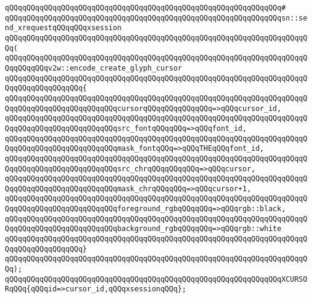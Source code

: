 \verb|qQQqqQQqqQQqqQQqqQQqqQQqqQQqqQQqqQQqqQQqqQQqqQQqqQQqqQQqqQQqqQQq#|\newline
\verb|qQQqqQQqqQQqqQQqqQQqqQQqqQQqqQQqqQQqqQQqqQQqqQQqqQQqqQQqqQQqqQQqsn::send_xrequestqQQqqQQqxsession|\newline
\verb|qQQqqQQqqQQqqQQqqQQqqQQqqQQqqQQqqQQqqQQqqQQqqQQqqQQqqQQqqQQqqQQqqQQqqQQq(|\newline
\verb|qQQqqQQqqQQqqQQqqQQqqQQqqQQqqQQqqQQqqQQqqQQqqQQqqQQqqQQqqQQqqQQqqQQqqQQqqQQqqQQqv2w::encode_create_glyph_cursor|\newline
\verb|qQQqqQQqqQQqqQQqqQQqqQQqqQQqqQQqqQQqqQQqqQQqqQQqqQQqqQQqqQQqqQQqqQQqqQQqqQQqqQQqqQQqqQQq{|\newline
\verb|qQQqqQQqqQQqqQQqqQQqqQQqqQQqqQQqqQQqqQQqqQQqqQQqqQQqqQQqqQQqqQQqqQQqqQQqqQQqqQQqqQQqqQQqqQQqqQQqcursorqQQqqQQqqQQqqQQq=>qQQqcursor_id,|\newline
\newline
\verb|qQQqqQQqqQQqqQQqqQQqqQQqqQQqqQQqqQQqqQQqqQQqqQQqqQQqqQQqqQQqqQQqqQQqqQQqqQQqqQQqqQQqqQQqqQQqqQQqsrc_fontqQQqqQQq=>qQQqfont_id,|\newline
\verb|qQQqqQQqqQQqqQQqqQQqqQQqqQQqqQQqqQQqqQQqqQQqqQQqqQQqqQQqqQQqqQQqqQQqqQQqqQQqqQQqqQQqqQQqqQQqqQQqmask_fontqQQq=>qQQqTHEqQQqfont_id,|\newline
\newline
\verb|qQQqqQQqqQQqqQQqqQQqqQQqqQQqqQQqqQQqqQQqqQQqqQQqqQQqqQQqqQQqqQQqqQQqqQQqqQQqqQQqqQQqqQQqqQQqqQQqsrc_chrqQQqqQQqqQQq=>qQQqcursor,|\newline
\verb|qQQqqQQqqQQqqQQqqQQqqQQqqQQqqQQqqQQqqQQqqQQqqQQqqQQqqQQqqQQqqQQqqQQqqQQqqQQqqQQqqQQqqQQqqQQqqQQqmask_chrqQQqqQQq=>qQQqcursor+1,|\newline
\newline
\verb|qQQqqQQqqQQqqQQqqQQqqQQqqQQqqQQqqQQqqQQqqQQqqQQqqQQqqQQqqQQqqQQqqQQqqQQqqQQqqQQqqQQqqQQqqQQqqQQqforeground_rgbqQQqqQQq=>qQQqrgb::black,|\newline
\verb|qQQqqQQqqQQqqQQqqQQqqQQqqQQqqQQqqQQqqQQqqQQqqQQqqQQqqQQqqQQqqQQqqQQqqQQqqQQqqQQqqQQqqQQqqQQqqQQqbackground_rgbqQQqqQQq=>qQQqrgb::white|\newline
\verb|qQQqqQQqqQQqqQQqqQQqqQQqqQQqqQQqqQQqqQQqqQQqqQQqqQQqqQQqqQQqqQQqqQQqqQQqqQQqqQQqqQQqqQQq}|\newline
\verb|qQQqqQQqqQQqqQQqqQQqqQQqqQQqqQQqqQQqqQQqqQQqqQQqqQQqqQQqqQQqqQQqqQQqqQQq);|\newline
\newline
\verb|qQQqqQQqqQQqqQQqqQQqqQQqqQQqqQQqqQQqqQQqqQQqqQQqqQQqqQQqqQQqqQQqXCURSORqQQq{qQQqid=>cursor_id,qQQqxsessionqQQq};|\newline
